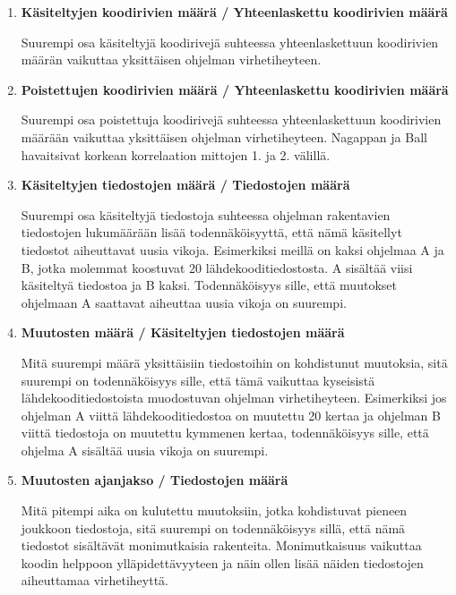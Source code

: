 \documentclass[finnish]{../tktltiki2}
\theoremstyle{definition}
\theoremstyle{remark}
\begin{document}
\begin{enumerate}
    
    \item {\bf Käsiteltyjen koodirivien määrä / Yhteenlaskettu koodirivien määrä}
    
    Suurempi osa käsiteltyjä koodirivejä suhteessa yhteenlaskettuun koodirivien määrän vaikuttaa yksittäisen ohjelman 
    virhetiheyteen.
    
    \item {\bf Poistettujen koodirivien määrä / Yhteenlaskettu koodirivien määrä}
    
    Suurempi osa poistettuja koodirivejä suhteessa yhteenlaskettuun koodirivien määrään vaikuttaa yksittäisen ohjelman 
    virhetiheyteen. Nagappan ja Ball havaitsivat korkean korrelaation mittojen 1. ja 2. välillä.
    
    \item {\bf Käsiteltyjen tiedostojen määrä / Tiedostojen määrä}
    
    Suurempi osa käsiteltyjä tiedostoja suhteessa ohjelman rakentavien tiedostojen lukumäärään lisää todennäköisyyttä, 
    että nämä käsitellyt tiedostot aiheuttavat uusia vikoja. Esimerkiksi meillä on kaksi ohjelmaa A ja B, jotka molemmat 
    koostuvat 20 lähdekooditiedostosta. A sisältää viisi käsiteltyä tiedostoa ja B kaksi. Todennäköisyys sille, että 
    muutokset ohjelmaan A saattavat aiheuttaa uusia vikoja on suurempi.
    
    \item {\bf Muutosten määrä / Käsiteltyjen tiedostojen määrä}
    
    Mitä suurempi määrä yksittäisiin tiedostoihin on kohdistunut muutoksia, sitä suurempi on todennäköisyys sille, että 
    tämä vaikuttaa kyseisistä lähdekooditiedostoista muodostuvan ohjelman virhetiheyteen. Esimerkiksi jos ohjelman A 
    viittä lähdekooditiedostoa on muutettu 20 kertaa ja ohjelman B viittä tiedostoja on muutettu kymmenen kertaa, 
    todennäköisyys sille, että ohjelma A sisältää uusia vikoja on suurempi.

    \item {\bf Muutosten ajanjakso / Tiedostojen määrä}
    
    Mitä pitempi aika on kulutettu muutoksiin, jotka kohdistuvat pieneen joukkoon tiedostoja, sitä suurempi on 
    todennäköisyys sillä, että nämä tiedostot sisältävät monimutkaisia rakenteita. Monimutkaisuus vaikuttaa koodin 
    helppoon ylläpidettävyyteen ja näin ollen lisää näiden tiedostojen aiheuttamaa virhetiheyttä.


\end{enumerate}
\end{document}

